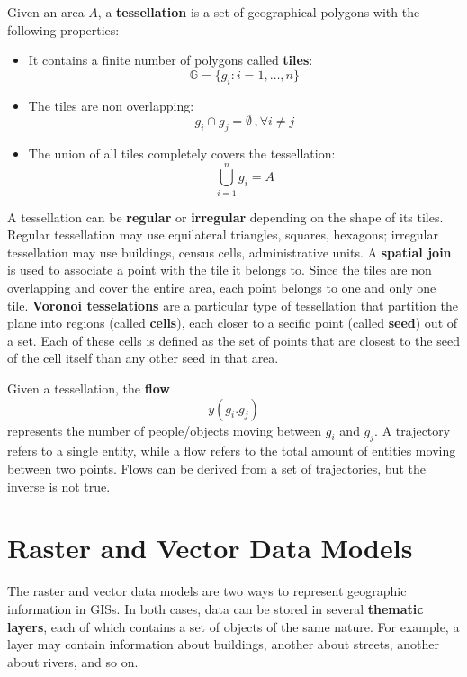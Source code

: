 Given an area $A$, a \textbf{tessellation} is a set of geographical polygons with the following properties:
\begin{itemize}
    \item It contains a finite number of polygons called \textbf{tiles}:
    \begin{equation*}
        \mathbb{G} = \{g_i : i = 1, \dots, n\}
    \end{equation*}
    \item The tiles are non overlapping:
    \begin{equation*}
        g_i \cap g_j = \emptyset \,, \forall i \neq j
    \end{equation*}
    \item The union of all tiles completely covers the tessellation:
    \begin{equation*}
        \bigcup_{i=1}^n g_i = A
    \end{equation*}
\end{itemize}
A tessellation can be \textbf{regular} or \textbf{irregular} depending on the shape of its tiles. Regular tessellation may use equilateral triangles, squares, hexagons; irregular tessellation may use buildings, census cells, administrative units. A \textbf{spatial join} is used to associate a point with the tile it belongs to. Since the tiles are non overlapping and cover the entire area, each point belongs to one and only one tile. \textbf{Voronoi tesselations} are a particular type of tessellation that partition the plane into regions (called \textbf{cells}), each closer to a secific point (called \textbf{seed}) out of a set. Each of these cells is defined as the set of points that are closest to the seed of the cell itself than any other seed in that area.

Given a tessellation, the \textbf{flow}
\begin{equation*}
    y(g_i. g_j)
\end{equation*}
represents the number of people/objects moving between $g_i$ and $g_j$. A trajectory refers to a single entity, while a flow refers to the total amount of entities moving between two points. Flows can be derived from a set of trajectories, but the inverse is not true.

\section{Raster and Vector Data Models}

The raster and vector data models are two ways to represent geographic information in GISs. In both cases, data can be stored in several \textbf{thematic layers}, each of which contains a set of objects of the same nature. For example, a layer may contain information about buildings, another about streets, another about rivers, and so on.

